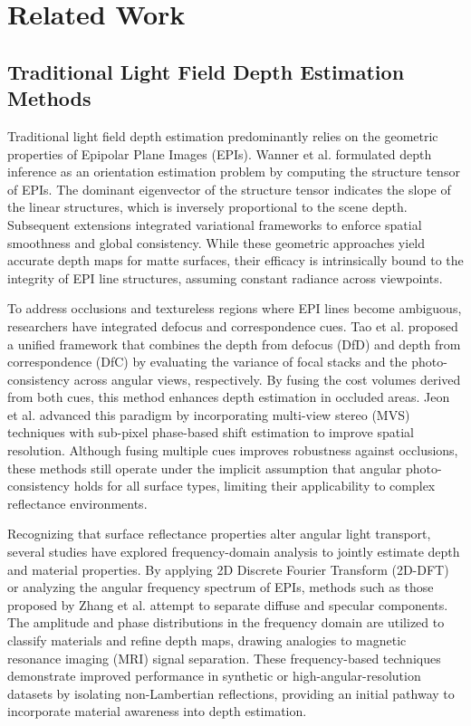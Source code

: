 \documentclass[lettersize,journal]{IEEEtran}
\begin{document}
\section{Related Work}

\subsection{Traditional Light Field Depth Estimation Methods}

Traditional light field depth estimation predominantly relies on the geometric properties of Epipolar Plane Images (EPIs). Wanner et al. \cite{he2016} formulated depth inference as an orientation estimation problem by computing the structure tensor of EPIs. The dominant eigenvector of the structure tensor indicates the slope of the linear structures, which is inversely proportional to the scene depth. Subsequent extensions integrated variational frameworks to enforce spatial smoothness and global consistency. While these geometric approaches yield accurate depth maps for matte surfaces, their efficacy is intrinsically bound to the integrity of EPI line structures, assuming constant radiance across viewpoints.

To address occlusions and textureless regions where EPI lines become ambiguous, researchers have integrated defocus and correspondence cues. Tao et al. \cite{vaswani2017} proposed a unified framework that combines the depth from defocus (DfD) and depth from correspondence (DfC) by evaluating the variance of focal stacks and the photo-consistency across angular views, respectively. By fusing the cost volumes derived from both cues, this method enhances depth estimation in occluded areas. Jeon et al. advanced this paradigm by incorporating multi-view stereo (MVS) techniques with sub-pixel phase-based shift estimation to improve spatial resolution. Although fusing multiple cues improves robustness against occlusions, these methods still operate under the implicit assumption that angular photo-consistency holds for all surface types, limiting their applicability to complex reflectance environments.

Recognizing that surface reflectance properties alter angular light transport, several studies have explored frequency-domain analysis to jointly estimate depth and material properties. By applying 2D Discrete Fourier Transform (2D-DFT) or analyzing the angular frequency spectrum of EPIs, methods such as those proposed by Zhang et al. attempt to separate diffuse and specular components. The amplitude and phase distributions in the frequency domain are utilized to classify materials and refine depth maps, drawing analogies to magnetic resonance imaging (MRI) signal separation. These frequency-based techniques demonstrate improved performance in synthetic or high-angular-resolution datasets by isolating non-Lambertian reflections, providing an initial pathway to incorporate material awareness into depth estimation.
\end{document}
